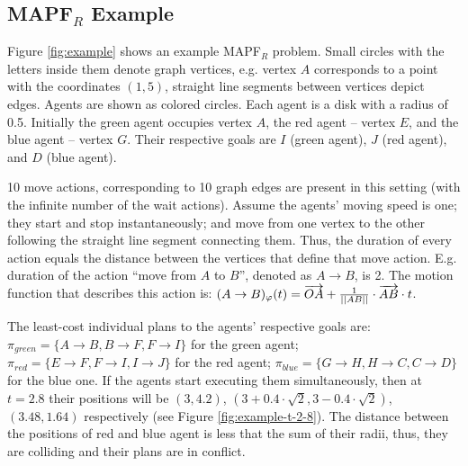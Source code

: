 \documentclass[review]{elsarticle}
\newcommand\konstantin[1]{\nb{\textbf{Konstantin:}}{red}{#1}}
\newcommand\roni[1]{\nb{\textbf{Roni:}}{green}{#1}}
\newcommand{\mapfr}{\ac{MAPF}$_R$\xspace}
\begin{document}
\subsection{\mapfr Example}
Figure \ref{fig:example} shows an example \mapfr problem. 
Small circles with the letters inside them denote graph vertices, e.g. vertex $A$ corresponds to a point with the coordinates $(1, 5)$, straight line segments between vertices depict edges. %
Agents are shown as colored circles. Each agent is a disk with a radius of 0.5. Initially the green agent occupies vertex $A$, the red agent -- vertex $E$, and the blue agent -- vertex $G$. Their respective goals are $I$ (green agent), $J$ (red agent), and $D$ (blue agent).

10 move actions, corresponding to 10 graph edges are present in this setting (with the infinite number of the wait actions). Assume the agents' moving speed is one; they start and stop instantaneously; and move from one vertex to the other following the straight line segment connecting them. Thus, the duration of every action equals the distance between the vertices that define that move action. E.g. duration of the action ``move from $A$ to $B$'', denoted as $A \rightarrow B$, is 2. The motion function that describes this action is: $(A \rightarrow B)_\varphi(t) = \overrightarrow{OA} + {1\over{||AB||}} \cdot \overrightarrow{AB} \cdot t$.

The least-cost individual plans to the agents' respective goals are: $\pi_{green}=\{A \rightarrow B, B \rightarrow F, F \rightarrow I\}$ for the green agent; $\pi_{red}=\{E \rightarrow F, F \rightarrow I, I \rightarrow J\}$ for the red agent; $\pi_{blue}=\{G \rightarrow H, H \rightarrow C, C \rightarrow D\}$ for the blue one. If the agents start executing them simultaneously, then at $t=2.8$ their positions will be $(3, 4.2)$, $(3+0.4\cdot \sqrt{2}, 3-0.4\cdot \sqrt{2})$, $(3.48, 1.64)$  respectively (see Figure \ref{fig:example-t-2-8}). The distance between the positions of red and blue agent is less that the sum of their radii, thus, they are colliding and their plans are in conflict. 

\end{document}
